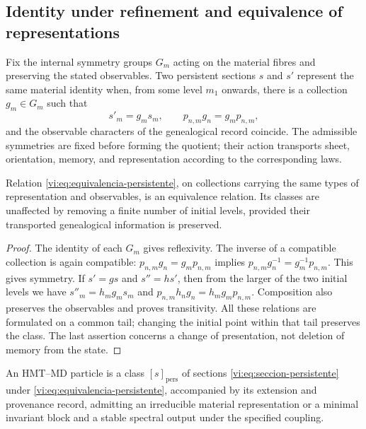 \subsection{Identity under refinement and equivalence of representations}
\label{vi:subsec:identidad-material}

Fix the internal symmetry groups $G_m$ acting on the material
fibres and preserving the stated observables. Two persistent
sections $s$ and $s'$ represent the same material identity when,
from some level $m_1$ onwards, there is a collection $g_m\in G_m$ such that
\begin{equation}
 s'_m=g_ms_m,\qquad
 p_{n,m}g_n=g_mp_{n,m},
 \label{vi:eq:equivalencia-persistente}
\end{equation}
and the observable characters of the genealogical record coincide. The
admissible symmetries are fixed before forming the quotient; their action
transports sheet, orientation, memory, and representation according to
the corresponding laws.

\begin{proposition}
\label{vi:prop:equivalencia-persistente}
Relation \eqref{vi:eq:equivalencia-persistente}, on collections carrying
the same types of representation and observables, is an equivalence
relation. Its classes are unaffected by removing a finite number
of initial levels, provided their transported genealogical
information is preserved.
\end{proposition}
\begin{proof}
The identity of each $G_m$ gives reflexivity. The inverse of a compatible
collection is again compatible:
$p_{n,m}g_n=g_mp_{n,m}$ implies
$p_{n,m}g_n^{-1}=g_m^{-1}p_{n,m}$. This gives symmetry.
If $s'=gs$ and $s''=hs'$, then from the larger of the two initial levels
we have $s''_m=h_mg_ms_m$ and
$p_{n,m}h_ng_n=h_mg_mp_{n,m}$. Composition also preserves the
observables and proves transitivity. All these relations are formulated
on a common tail; changing the initial point within that tail
preserves the class. The last assertion concerns a change of
presentation, not deletion of memory from the state.
\end{proof}

\begin{definition}
\label{vi:def:particula}
An HMT--MD particle is a class $[s]_{\mathrm{pers}}$ of sections
\eqref{vi:eq:seccion-persistente} under
\eqref{vi:eq:equivalencia-persistente}, accompanied by its extension and
provenance record, admitting an irreducible material
representation or a minimal invariant block and a stable spectral output
under the specified coupling.
\end{definition}

